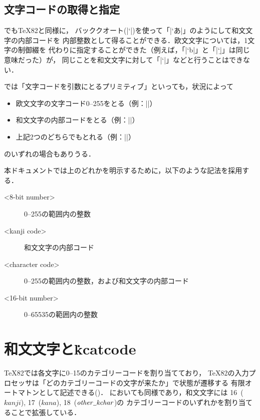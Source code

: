 \documentclass[a4paper,11pt,nomag,dvipdfmx]{jsarticle}
\def\_{\leavevmode\vrule width .45em height -.2ex depth .3ex\relax}
\begin{document}
\subsection{文字コードの取得と指定}
\pTeX でも\TeX82と同様に，
バッククオート(|`|)を使って「|`あ|」のようにして和文文字の内部コードを
内部整数として得ることができる．欧文文字については，1文字の制御綴を
代わりに指定することができた（例えば，「|`b|」と「|`\b|」は同じ意味だった）が，
同じことを和文文字に対して「|`\あ|」などと行うことはできない．

\pTeX では「文字コードを引数にとるプリミティブ」といっても，状況によって
\begin{itemize}
 \item 欧文文字の文字コード0--255をとる（例：|\catcode|）
 \item 和文文字の内部コードをとる（例：|\inhibitxspcode|）
 \item 上記2つのどちらでもとれる（例：|\prebreakpenalty|）
\end{itemize}
のいずれの場合もありうる．

\medskip

本ドキュメントでは上のどれかを明示するために，以下のような記法を採用する．
\begin{description}
 \item[<8-bit number>] 0--255の範囲内の整数
 \item[<kanji code>] 和文文字の内部コード
 \item[<character code>] 0--255の範囲内の整数，および和文文字の内部コード
 \item[<16-bit number>] 0--65535の範囲内の整数
\end{description}

\section{和文文字と\.{kcatcode}}
\TeX82では各文字に0--15のカテゴリーコードを割り当てており，
\TeX82の入力プロセッサは「どのカテゴリーコードの文字が来たか」で状態が遷移する
有限オートマトンとして記述できる(\cite{topic})．
\pTeX においても同様であり，和文文字には
16~($\mathit{kanji}$), 17~($\mathit{kana}$), 18~($\mathit{other\_kchar}$)の
カテゴリーコードのいずれかを割り当てることで拡張している．
\end{document}
